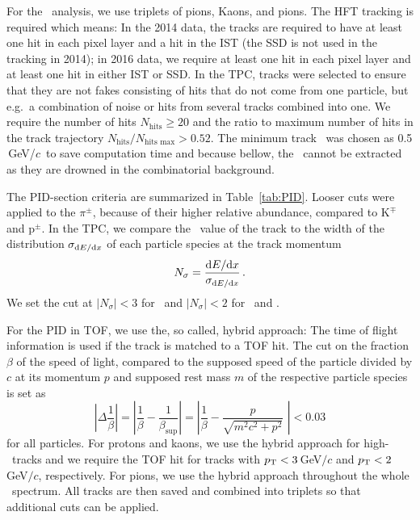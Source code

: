 For the \Lambdac\ analysis, we use triplets of pions, Kaons, and pions. The HFT tracking is required which means: In the 2014 data, the tracks are required to have at least one hit in each pixel layer and a hit in the IST (the SSD is not used in the tracking in 2014); in 2016 data, we require at least one hit in each pixel layer and at least one hit in either IST or SSD\@.  In the TPC, tracks were selected to ensure that they are not fakes consisting of hits that do not come from one particle, but e.g.\ a combination of noise or hits from several tracks combined into one. We require the number of hits $N_\mathrm{hits} \geq 20$ and the ratio to maximum number of hits in the track trajectory $N_\mathrm{hits}/N_\text{hits max} > 0.52$\@. The minimum track \pt\ was chosen as 0.5$\,$GeV/$c$\ to save computation time and because bellow, the \Lambdac\ cannot be extracted as they are drowned in the combinatorial background\@.

The PID-section criteria are summarized in Table~\ref{tab:PID}. Looser cuts were applied to the $\pi^\pm$, because of their higher relative abundance, compared to K$^\mp$ and p$^\pm$. In the TPC, we compare the \dedx\ value of the track to the width of the distribution $\sigma_{\mathrm{d} E / \mathrm{d} x}$ of each particle species at the track momentum
\begin{equation}
N_\sigma = \frac{\mathrm{d} E / \mathrm{d} x}{\sigma_{\mathrm{d} E / \mathrm{d} x}}\,. 
\end{equation}
We set the cut at $|N_\sigma| < 3$ for \pipm\ and $|N_\sigma| < 2$ for \Kmp\ and \ppm\@. 

For the PID in TOF, we use the, so called, hybrid approach: The time of flight information is used if the track is matched to a TOF hit. The cut on the fraction $\beta$ of the speed of light, compared to the supposed speed of the particle divided by $c$ at its momentum $p$ and supposed rest mass $m$ of the respective particle species is set as
\begin{equation}
 \left|\Delta \frac{1}{\beta}\right| = \left| \frac{1}{\beta} - \frac{1}{\beta_\mathrm{sup}} \right| = \left| \frac{1}{\beta} - \frac{p}{\sqrt{m^2c^2 + p^2}} \,\,\right| < 0.03
\end{equation}
for all particles. For protons and kaons, we use the hybrid approach for high-\pt\ tracks and we require the TOF hit for tracks with ${p_{\mathrm{T}}} < 3\,$GeV$/c$ and ${p_{\mathrm{T}}} < 2\,$GeV$/c$, respectively. For pions, we use the hybrid approach throughout the whole \pt\ spectrum. All tracks are then saved and combined into triplets so that additional cuts can be applied.


